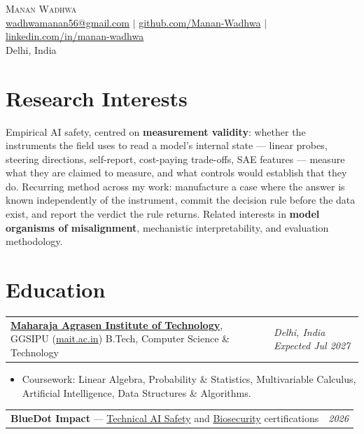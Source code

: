 \documentclass[letterpaper,10pt]{article}
\makeatletter
\newcommand{\cventry}[2]{%
    \begin{tabularx}{\textwidth}{@{}>{\raggedright\arraybackslash}X@{\hspace{8pt}}>{\raggedleft\arraybackslash}p{1.75in}@{}}
      #1 & \textit{\small #2}
    \end{tabularx}
}
\makeatother
\begin{document}
\begin{center}
    {\Huge \scshape Manan Wadhwa} \\ \vspace{4pt}
    \small
    \href{mailto:wadhwamanan56@gmail.com}{wadhwamanan56@gmail.com} $|$
    \href{https://github.com/Manan-Wadhwa}{github.com/Manan-Wadhwa} $|$
    \href{https://linkedin.com/in/manan-wadhwa}{linkedin.com/in/manan-wadhwa} \\ \vspace{2pt}
    \small Delhi, India
\end{center}
\vspace{-4pt}

\section{Research Interests}
\small{Empirical AI safety, centred on \textbf{measurement validity}: whether the instruments the field uses to read a model's internal state --- linear probes, steering directions, self-report, cost-paying trade-offs, SAE features --- measure what they are claimed to measure, and what controls would establish that they do. Recurring method across my work: manufacture a case where the answer is known independently of the instrument, commit the decision rule before the data exist, and report the verdict the rule returns. Related interests in \textbf{model organisms of misalignment}, mechanistic interpretability, and evaluation methodology.}

\section{Education}
\cventry{\href{https://mait.ac.in}{\textbf{Maharaja Agrasen Institute of Technology}}, GGSIPU (\href{https://mait.ac.in}{mait.ac.in}) \newline B.Tech, Computer Science \& Technology}{Delhi, India \newline Expected Jul 2027}
\begin{itemize}[leftmargin=0.2in, itemsep=1pt, topsep=2pt, parsep=0pt]
  \item \small Coursework: Linear Algebra, Probability \& Statistics, Multivariable Calculus, Artificial Intelligence, Data Structures \& Algorithms.
\end{itemize}
\vspace{3pt}
\cventry{\textbf{BlueDot Impact} --- \href{https://bluedot.org/certification?id=recYsLKJbx82ATFFc}{Technical AI Safety} and \href{https://bluedot.org/certification?id=recH1Or3khOy3JTBD}{Biosecurity} certifications}{2026}
\end{document}
